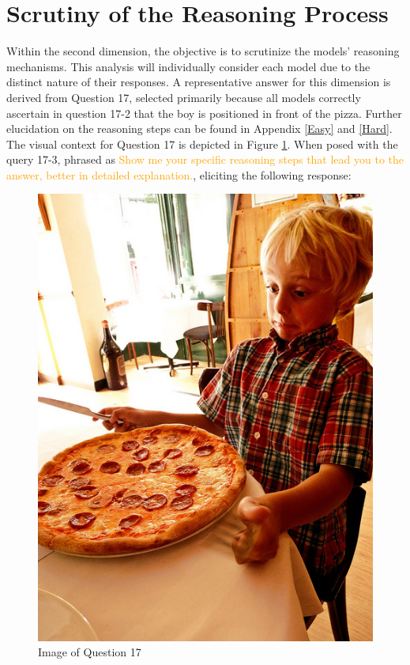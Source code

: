 \documentclass[twocolumn,11pt]{report}
\begin{document}
\section{Scrutiny of the Reasoning Process}\label{chap:reasoning}

Within the second dimension, the objective is to scrutinize the models' reasoning mechanisms. This analysis will individually consider each model due to the distinct nature of their responses. A representative answer for this dimension is derived from Question 17, selected primarily because all models correctly ascertain in question 17-2 that the boy is positioned in front of the pizza. Further elucidation on the reasoning steps can be found in Appendix \ref{Easy} and \ref{Hard}. The visual context for Question 17 is depicted in Figure \ref{fig:reasoning-process}. When posed with the query 17-3, phrased as \textcolor{orange}{Show me your specific reasoning steps that lead you to the answer, better in detailed explanation.}, eliciting the following response:

\begin{figure}[h]
    \centering
    \includegraphics[width=0.6\linewidth]{../image set/easy/000000089367.jpg}
    \caption{Image of Question 17}
    \label{fig:reasoning-process}
\end{figure}
\end{document}
